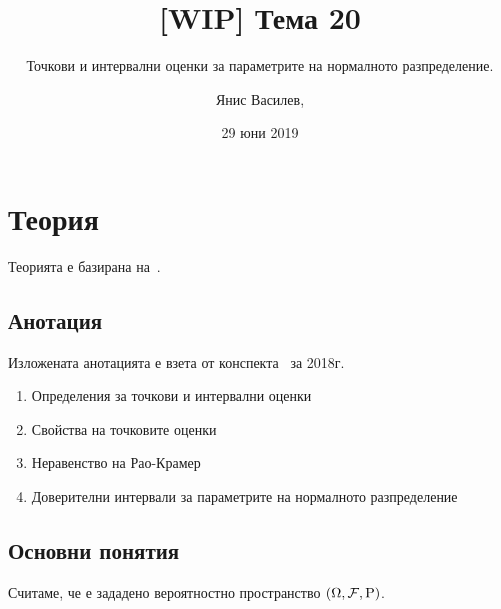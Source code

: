 \documentclass[numbers=endperiod, DIV=15, bibliography=totocnumbered]{scrartcl}
\title{[WIP] Тема 20}
\subtitle{Точкови и интервални оценки за параметрите на нормалното разпределение.}
\author{Янис Василев, \Email{ianis@ivasilev.net}}
\date{29 юни 2019}
\begin{document}
\maketitle

\section{Теория}

Теорията е базирана на~\cite{DimitrovYanev}.

\subsection{Анотация}

Изложената анотацията е взета от конспекта~\cite{Syllabus} за 2018г.

\begin{enumerate}
  \item Определения за точкови и интервални оценки
  \item Свойства на точковите оценки
  \item Неравенство на Рао-Крамер
  \item Доверителни интервали за параметрите на нормалното разпределение
\end{enumerate}

\subsection{Основни понятия}

Считаме, че е зададено вероятностно пространство $(\Omega, \mathcal{F}, \operatorname{P})$.
\end{document}
